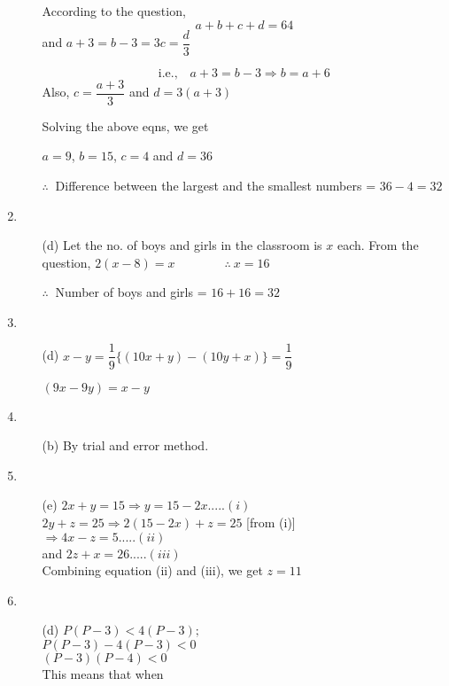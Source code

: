 \begin{multicols}{2}
\begin{enumerate}
\begin{itemize}
    According to the question,
    \begin{equation*}
      a + b + c + d = 64\tag*{....(i)}
    \end{equation*}
    and $a + 3 = b - 3 = 3c = \dfrac{d}{3}$

    \begin{equation*}
      \text{i.e.,}\quad a + 3 = b - 3 \Rightarrow b = a + 6\tag*{...(ii)}
    \end{equation*}
    Also, $c = \dfrac{a + 3}{3}$ and $d = 3 (a + 3)$

    Solving the above eqns, we get

    $a = 9$, $b = 15$, $c = 4$ and $d = 36$

    $\therefore~$ Difference between the largest and the smallest numbers = $36 - 4 = 32$
  \end{itemize}
\item
  \begin{itemize}
  \item[(d)] Let the no. of boys and girls in the classroom is $x$ each. From the question,
    $2(x - 8) = x \qquad\qquad \therefore~ x = 16$

    $\therefore~$ Number of boys and girls = $16 + 16 = 32$
  \end{itemize}
\item
  \begin{itemize}
  \item[(d)] $x - y = \dfrac{1}{9} \{(10x + y) - (10y + x)\} = \dfrac{1}{9}$

    $(9x - 9y) = x - y$
  \end{itemize}
\item
  \begin{itemize}
\item[(b)] By trial and error method.
  \end{itemize}
\item
  \begin{itemize}
  \item[(e)] $2x + y = 15 \Rightarrow y = 15 - 2x ..... (i)$\\
    $2y + z = 25 \Rightarrow 2(15 - 2x) + z = 25$ [from (i)]\\
    $\Rightarrow 4x - z = 5  ..... (ii)$\\
    and $2z + x = 26  ..... (iii)$\\
    Combining equation (ii) and (iii), we get $z = 11$
  \end{itemize}
\item
  \begin{itemize}
  \item[(d)] $P (P - 3) < 4 (P - 3);$\\
    $P (P - 3) -4 (P - 3) < 0$\\
    $(P - 3)(P - 4) < 0$\\
    This means that when


\end{itemize}
\end{enumerate}
\end{multicols}
